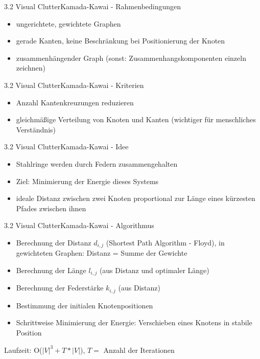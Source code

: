 \documentclass[%
11pt,a4paper,xcolor={usenames,dvipsnames}]{beamer}
\begin{document}

    \begin{frame}{3.2 Visual Clutter}{Kamada-Kawai - Rahmenbedingungen}
        \begin{itemize}
        	\item ungerichtete, gewichtete Graphen
        	\item gerade Kanten, keine Beschränkung bei Positionierung der Knoten
        	\item zusammenhängender Graph (sonst: Zusammenhangskomponenten einzeln zeichnen)
    	\end{itemize}
    \end{frame}

    \begin{frame}{3.2 Visual Clutter}{Kamada-Kawai - Kriterien}
        \begin{itemize}
        	\item Anzahl Kantenkreuzungen reduzieren
        	\item gleichmäßige Verteilung von Knoten und Kanten (wichtiger für menschliches Verständnis)
    	\end{itemize}
    \end{frame}

    \begin{frame}{3.2 Visual Clutter}{Kamada-Kawai - Idee}
        \begin{itemize}
        	\item Stahlringe werden durch Federn zusammengehalten
        	\item Ziel: Minimierung der Energie dieses Systems
        	\item ideale Distanz zwischen zwei Knoten proportional zur Länge eines kürzesten Pfades zwischen ihnen
    	\end{itemize}
    \end{frame}

    \begin{frame}{3.2 Visual Clutter}{Kamada-Kawai - Algorithmus}
        \begin{itemize}
        	\item Berechnung der Distanz $d_{i,j}$  (Shortest Path Algorithm - Floyd), in gewichteten Graphen: Distanz = Summe der Gewichte
        	\item Berechnung der Länge $l_{i,j}$ (aus Distanz und optimaler Länge)
        	\item Berechnung der Federstärke $k_{i,j}$ (aus Distanz)
        	\item Bestimmung der initialen Knotenpositionen
        	\item Schrittweise Minimierung der Energie: Verschieben eines Knotens in stabile Position
    	\end{itemize}

    	Laufzeit: O($|V|^3 + T * |V|$), $T =$ Anzahl der Iterationen
    \end{frame}
\end{document}
